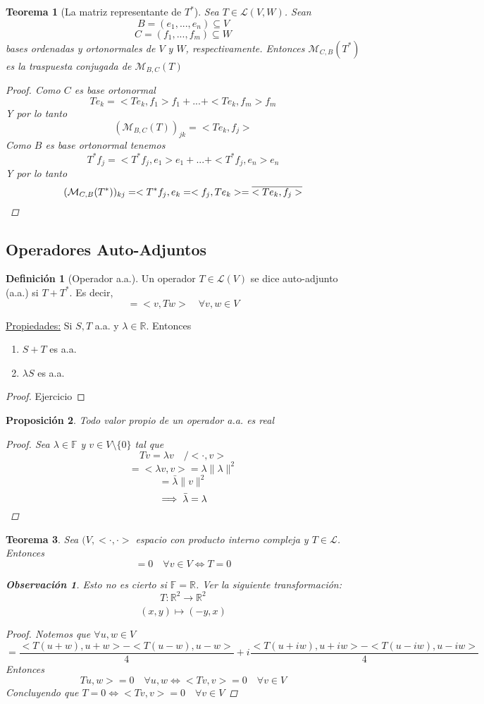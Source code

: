 \documentclass[11pt]{book}
\newcommand{\set}[1]{\mathbb{#1}}
\newcommand{\func}[5]{#1:#2\xrightarrow[#5]{#4}#3}
\newtheorem{thm}{Teorema}[section]
\newtheorem{prop}[thm]{Proposición}
\theoremstyle{definition}
\newtheorem{defn}{Definición}[section]
\newtheorem{obs}{Observación}[section]
\begin{document}
\begin{thm}[La matriz representante de $T^*$]
	Sea $T\in\mathcal{L}(V,W)$. Sean
	\[B=(e_1,...,e_n)\subseteq V\]
	\[C=(f_1,...,f_m)\subseteq W\]
	bases ordenadas y ortonormales de $V$ y $W$, respectivamente. Entonces $\mathcal{M}_{C,B}(T^*)$ es la traspuesta conjugada de $\mathcal{M}_{B,C}(T)$
	\begin{proof}
		Como $C$ es base ortonormal
		\[Te_k=<Te_k,f_1>f_1+...+<Te_k,f_m>f_m\]
		Y por lo tanto
		\[(\mathcal{M}_{B,C}(T))_{jk}=<Te_k,f_j>\]
		Como $B$ es base ortonormal tenemos
		\[T^*f_j=<T^*f_j,e_1>e_1+...+<T^*f_j,e_n>e_n\]
		Y por lo tanto
		\[(\mathcal{M}_{C,B}(T^*))_{kj}=<T^*f_j,e_k=<f_j,Te_k>=\overline{<Te_k,f_j>}\qedhere\]
	\end{proof}
\end{thm}
\subsection{Operadores Auto-Adjuntos}
\begin{defn}[Operador a.a.]
	Un operador $T\in\mathcal{L}(V)$ se dice auto-adjunto (a.a.) si $T+T^*$. Es decir,
	\[<Tv,w>=<v,Tw>\quad\forall v,w\in V\]
\end{defn}
\underline{Propiedades:} Si $S,T$ a.a. y $\lambda\in\set{R}$. Entonces
\begin{enumerate}[label=\alph*]
	\item $S+T$ es a.a.

	\item $\lambda S$ es a.a.
\end{enumerate}
\begin{proof}
	Ejercicio
\end{proof}
\begin{prop}
	Todo valor propio de un operador a.a. es real
	\begin{proof}
		Sea $\lambda\in\set{F}$ y $v\in V\setminus\{0\}$ tal que
		\[Tv=\lambda v\quad /<\cdot, v>\]
		\[<Tv,v>=<\lambda v, v>=\lambda \|\lambda\|^2\]
		\[<v,Tv>=\bar{\lambda}\|v\|^2\]
		\[\implies \bar{\lambda}=\lambda\qedhere\]
	\end{proof}
\end{prop}
\begin{thm}
	Sea $(V,<\cdot,\cdot>$ espacio con producto interno compleja y $T\in\mathcal{L}$. Entonces
	\[<Tv,v>=0\quad\forall v\in V\iff T=0\]
	\begin{obs}
		Esto no es cierto si $\set{F}=\set{R}$. Ver la siguiente transformación:
		\[\func{T}{\set{R}^2}{\set{R}^2}{}{}\]
		\[(x,y)\mapsto (-y,x)\]
	\end{obs}
	\begin{proof}
		Notemos que $\forall u,w\in V$
		\[<Tu,w>=\frac{<T(u+w),u+w>-<T(u-w),u-w>}{4}+i\frac{<T(u+iw),u+iw>-<T(u-iw),u-iw>}{4}\]
		Entonces
		\[Tu,w>=0\quad\forall u,w\iff <Tv,v>=0\quad\forall v\in V\]
		Concluyendo que $T=0\iff<Tv,v>=0\quad\forall v\in V$
	\end{proof}
\end{thm}
\end{document}
